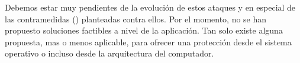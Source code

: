 \documentclass{llncs}
\theoremstyle{plain}        			%
\theoremstyle{definition}   			%
\theoremstyle{saltolinea}   			%
\begin{document}
Debemos estar muy pendientes de la evoluci\'on de estos ataques y en especial de las contramedidas (\cite{OST05}) planteadas contra ellos. Por el momento, no se han propuesto soluciones factibles a nivel de la aplicaci\'on. Tan solo existe alguna propuesta, mas o menos aplicable, para ofrecer una protecci\'on desde el sistema operativo o incluso desde la arquitectura del computador.




%
%
%

\providecommand{\bysame}{\leavevmode\hbox to3em{\hrulefill}\thinspace}
\providecommand{\MR}{\relax\ifhmode\unskip\space\fi MR }
\providecommand{\MRhref}[2]{%
  \href{http://www.ams.org/mathscinet-getitem?mr=#1}{#2}
}
\providecommand{\href}[2]{#2}
\end{document}
